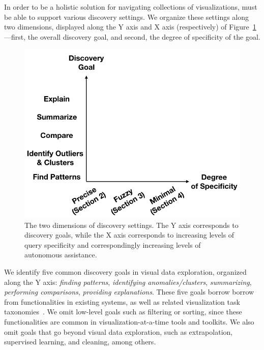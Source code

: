 \par
{} 
In order to be a holistic solution for 
navigating collections of visualizations,
\vida must be able to support various discovery
settings. 
We organize these settings along two
dimensions, displayed along the Y axis and 
X axis (respectively) of Figure~\ref{fig:dimensions}---first, 
the overall discovery goal,
and second, the degree of specificity of the goal.


\begin{figure}
\centering
\includegraphics[width=\linewidth]{figures/dimensions_cropped.png}
\vspace{-10pt}
\caption{The two dimensions of discovery settings. The Y axis corresponds to discovery goals, while the X axis corresponds to increasing levels of query specificity and correspondingly increasing levels of autonomous assistance.}\label{fig:dimensions}
\vspace{-10pt}
\end{figure}

\par
 We identify five 
common discovery goals in visual data exploration, organized
along the Y axis:
{\em finding patterns}, {\em identifying anomalies/clusters}, {\em summarizing}, 
{\em performing comparisons}, {\em providing explanations}.
These five goals borrow borrow from functionalities in existing
systems, as well as related visualization task taxonomies~\cite{Heer2012,Amar2005}.
We omit low-level goals such as filtering or sorting, since
these functionalities are common in 
visualization-at-a-time tools and toolkits.
We also omit goals that go beyond visual data exploration,
such as extrapolation, supervised learning, and cleaning, among others. 

